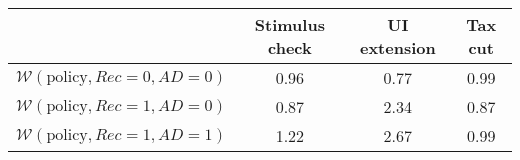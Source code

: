 \begin{tabular}{@{}lccc@{}} 
\toprule 
                          & Stimulus check      & UI extension    & Tax cut    \\  \midrule 
$\mathcal{W}(\text{policy}, Rec=0, AD=0)$ & 0.96  & 0.77  & 0.99     \\ 
$\mathcal{W}(\text{policy}, Rec=1, AD=0)$ & 0.87  & 2.34  & 0.87     \\ 
$\mathcal{W}(\text{policy}, Rec=1, AD=1)$ & 1.22  & 2.67  & 0.99     \\ \bottomrule 
\end{tabular}  
